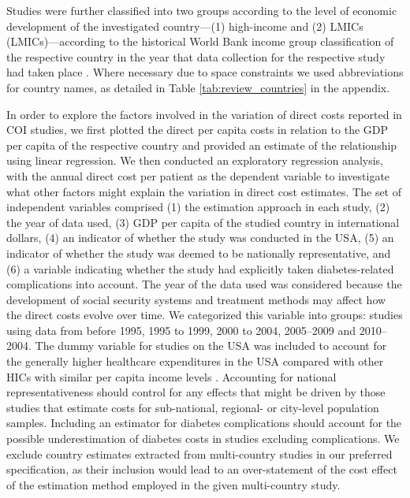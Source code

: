 Studies were further classified into two groups according to the level of economic development of the investigated country---(1) high-income and (2) \acp{LMIC} (\acp{LMIC})---according to the historical World Bank income group classification of the respective country in the year that data collection for the respective study had taken place \parencite{WorldBank}. Where necessary due to space constraints we used abbreviations for country names, as detailed in Table \ref{tab:review_countries} in the appendix.

In order to explore the factors involved in the variation of direct costs reported in \ac{COI} studies, we first plotted the direct per capita costs in relation to the \ac{GDP} per capita of the respective country and provided an estimate of the relationship using linear regression. We then conducted an exploratory regression analysis, with the annual direct cost per patient as the dependent variable to investigate what other factors might explain the variation in direct cost estimates. The set of independent variables comprised (1) the estimation approach in each study, (2) the year of data used, (3) \ac{GDP} per capita of the studied country in international dollars, (4) an indicator of whether the study was conducted in the USA, (5) an indicator of whether the study was deemed to be nationally representative, and (6) a variable indicating whether the study had explicitly taken diabetes-related complications into account. The year of the data used was considered because the development of social security systems and treatment methods may affect how the direct costs evolve over time. We categorized this variable into groups: studies using data from before 1995, 1995 to 1999, 2000 to 2004, 2005--2009 and 2010--2004.  The dummy variable for studies on the USA was included to account for the generally higher healthcare expenditures in the USA compared with other \acp{HIC} with similar per capita income levels \parencite{Laugesen2011}. Accounting for national representativeness should control for any effects that might be driven by those studies that estimate costs for sub-national, regional- or city-level population samples. Including an estimator for diabetes complications should account for the possible underestimation of diabetes costs in studies excluding complications. We exclude country estimates extracted from multi-country studies in our preferred specification, as their inclusion would lead to an over-statement of the cost effect of the estimation method employed in the given multi-country study. 

